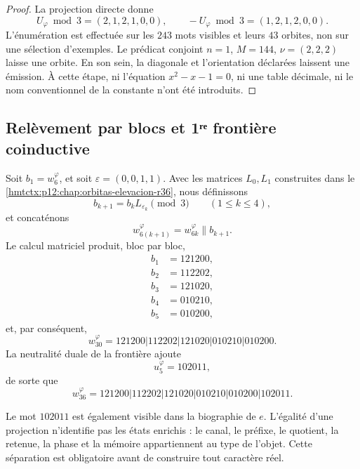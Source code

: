 \begin{proof}
La projection directe donne
\[
 U_{\varphi}\bmod3=(2,1,2,1,0,0),
 \qquad
 -U_{\varphi}\bmod3=(1,2,1,2,0,0).
\]
L’énumération est effectuée sur les \(243\) mots visibles et leurs
\(43\) orbites, non sur une sélection d’exemples. Le prédicat conjoint
\(n=1\), \(M=144\), \(\nu=(2,2,2)\) laisse une orbite. En son sein, la
diagonale et l’orientation déclarées laissent une émission. À cette étape,
ni l’équation \(x^2-x-1=0\), ni une table décimale, ni le nom
conventionnel de la constante n’ont été introduits.
\end{proof}

\subsection{Relèvement par blocs et 1ʳᵉ frontière coinductive}

Soit \(b_1=w_6^{\varphi}\), et soit
\(\varepsilon=(0,0,1,1)\). Avec les matrices \(L_0,L_1\) construites dans le
\cref{hmtctx:p12:chap:orbitas-elevacion-r36}, nous définissons
\[
 b_{k+1}=b_kL_{\varepsilon_k}\pmod3
 \qquad(1\leq k\leq4),
\]
et concaténons
\[
 w_{6(k+1)}^{\varphi}=w_{6k}^{\varphi}\mathbin{\|}b_{k+1}.
\]
Le calcul matriciel produit, bloc par bloc,
\[
\begin{aligned}
 b_1&=121200,\\
 b_2&=112202,\\
 b_3&=121020,\\
 b_4&=010210,\\
 b_5&=010200,
\end{aligned}
\]
et, par conséquent,
\begin{equation}
 \boxed{
 w_{30}^{\varphi}
 =121200|112202|121020|010210|010200.}
 \label{p12-83-c9-s3:eq:w30-phi}
\end{equation}
La neutralité duale de la frontière ajoute
\[
 u_5^{\varphi}=102011,
\]
de sorte que
\begin{equation}
 \boxed{
 w_{36}^{\varphi}
 =121200|112202|121020|010210|010200|102011.}
 \label{p12-83-c9-s3:eq:w36-phi}
\end{equation}

\begin{remark}
Le mot \(102011\) est également visible dans la biographie de \(e\). L’égalité
d’une projection n’identifie pas les états enrichis : le canal,
le préfixe, le quotient, la retenue, la phase et la mémoire appartiennent au type
de l’objet. Cette séparation est obligatoire avant de construire tout
caractère réel.
\end{remark}

